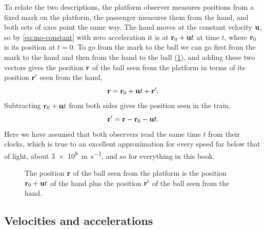 To relate the two descriptions, the platform observer measures positions
from a fixed mark on the platform, the passenger measures them from the
hand, and both sets of axes point the same way. The hand moves at the
constant velocity $\bm{\mathrm{u}}$, so by \cref{eq:mo-constant} with zero
acceleration it is at $\bm{\mathrm{r}}_0 + \bm{\mathrm{u}}t$ at time $t$, where $\bm{\mathrm{r}}_0$
is its position at $t = 0$. To go from the mark to the ball we can go
first from the mark to the hand and then from the hand to the ball
(\cref{fig:ne-positions}), and adding these two vectors gives the
position $\bm{\mathrm{r}}$ of the ball seen from the platform in terms of its
position $\bm{\mathrm{r}}'$ seen from the hand,
\begin{equation*}
   \bm{\mathrm{r}} = \bm{\mathrm{r}}_0 + \bm{\mathrm{u}}t + \bm{\mathrm{r}}' .
\end{equation*}
Subtracting $\bm{\mathrm{r}}_0 + \bm{\mathrm{u}}t$ from both sides gives the position seen
in the train,
\begin{equation}
   \bm{\mathrm{r}}' = \bm{\mathrm{r}} - \bm{\mathrm{r}}_0 - \bm{\mathrm{u}}t .
   \label{eq:ne-galilean}
\end{equation}
Here we have assumed that both observers read the same time $t$ from
their clocks, which is true to an excellent approximation for every speed
far below that of light, about \SI{3e8}{\metre\per\second}, and so for
everything in this book.

\begin{figure}[htb]
\centering
{}
\caption{The position $\bm{\mathrm{r}}$ of the ball seen from the platform is the
position $\bm{\mathrm{r}}_0 + \bm{\mathrm{u}}t$ of the hand plus the position $\bm{\mathrm{r}}'$ of
the ball seen from the hand.}
\label{fig:ne-positions}
\end{figure}

\subsection*{Velocities and accelerations}

